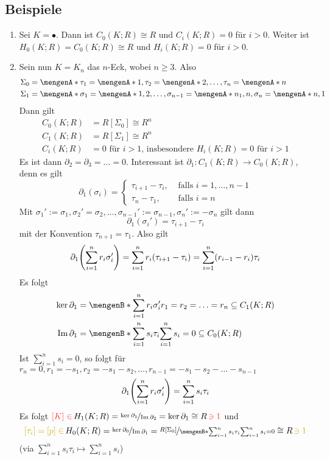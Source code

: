 \subsection[Beispiele für Homologiemoduln]{Beispiele} %
\label{sub:311}
\begin{enumerate}[(1)]
	\item Sei $K= \bullet$. Dann ist $C_0(K;R) \cong R$ und $C_i(K;R) = 0$ für $i>0$. Weiter ist $H_0(K;R) = C_0(K;R) \cong R$ und $H_i(K;R) =0$ für $i>0$.
	\item Sein nun $K=K_n$ das $n$-Eck, wobei $n \ge 3$.  Also
	\begin{align*}
		\Sigma_0 &= \set{\tau_1=\set{1}, \tau_2=\set{2}, \ldots , \tau_n = \set{n}  } \\
 		\Sigma_1 &= \set{\sigma_1 = \set{1,2}, \ldots , \sigma_{n-1} = \set{n_1, n}, \sigma_n=\set{n,1} } 
	\end{align*}
	Dann gilt
	\begin{align*}
		C_0(K;R) &= R[\Sigma_0] \cong R^{n} \\
		C_1(K;R) &= R[\Sigma_1] \cong R^{n} \\
		C_i(K;R) &= 0 \text{ für $i>1$, insbesondere } H_i(K;R) = 0 \text{ für } i>1
	\end{align*}
	Es ist dann $\partial_2 = \partial_3 = \ldots  = 0$. Interessant ist $\partial_1 : C_1(K;R) \to C_0(K;R)$, denn es gilt
	\[
		\partial_1(\sigma_i) = \begin{cases}
			\tau_{i+1} - \tau_i, &\text{ falls }i=1, \ldots ,n-1\\
			\tau_n - \tau_1 , &\text{ falls } i=n
		\end{cases}
	\]
	Mit $\sigma_1' := \sigma_1, \sigma_2' = \sigma_2, \ldots , \sigma_{n-1}' := \sigma_{n-1}, \sigma_n' := - \sigma_n$ gilt dann
	\[
		\partial_1 (\sigma_i') = \tau_{i+1} - \tau_i
	\]
	mit der Konvention $\tau_{n+1} = \tau_1$. Also gilt
	\begin{align*}
		\partial_1 \enbrace*{\sum_{i=1}^{n} r_i \sigma_i' } = \sum_{i=1}^{n} r_i \enbrace*{\tau_{i+1}- \tau_i} = \sum_{i=1}^{n} (r_{i-1} - r_i) \tau_i  
	\end{align*}
	Es folgt 
	\begin{align*}
		\ker \partial_1 &= \set[\sum_{i=1}^{n} r_i \sigma_i']{r_1=r_2= \ldots =r_n} \subseteq C_1(K;R) \\
		\im \partial_1 &= \set[\sum_{i=1}^{n} s_i \tau_i]{\sum_{i=1}^{n} s_i =0} \subseteq C_0(K;R)
	\end{align*}
	Ist $\sum_{i=1}^{n} s_i =0$, so folgt für $r_n=0, r_1 = -s_1, r_2=-s_1 -s_2, \ldots , r_{n-1} = -s_1 - s_2 - \ldots - s_{n-1}$
	\[
		\partial_1 \enbrace*{\sum_{i=1}^{n} r_i \sigma_i'} = \sum_{i=1}^{n} s_i \tau_i 
	\]
	Es folgt ${\color{Firebrick1}[K] \in}\, H_1(K;R) = \nicefrac{\ker \partial_1}{\im \partial_2} = \ker \partial_1 \cong R \,{\color{Firebrick1}\ni 1}$ und 
	\[
		{ \color{Gold3} [\tau_i] =[p] \in }\, H_0(K;R) = \nicefrac{\ker \partial_0}{\im \partial_1} = \nicefrac{R[\Sigma_0]}{ \set[\sum_{i=1}^{n} s_i \tau_i]{\sum_{i=1}^{n} s_i =0} } \cong R \, { \color{Gold3} \ni 1 }
	\]
	(via $\sum_{i=1}^{n} s_i \tau_i \longmapsto \sum_{i=1}^{n} s_i$)
\end{enumerate}

